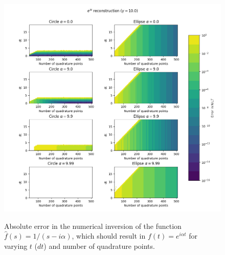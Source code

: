 \documentclass[10pt,a4paper,final]{article}
\begin{document}
\begin{figure}[h!]
\centering
\includegraphics[scale=0.7]{nilt_expix_error}
\label{fig:const_trunc16}
\caption{Absolute error in the numerical inversion of the function $\widehat{f}(s)=1/(s-i\alpha)$, which should result in $f(t)=e^{i\alpha t}$ for varying $t$ ($dt$) and number of quadrature points. }
\end{figure}


\clearpage



 
\end{document}
